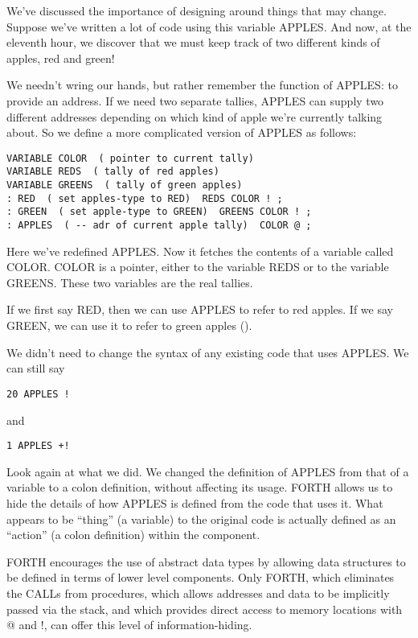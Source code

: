 We've discussed the importance of designing around things that may
change. Suppose we've written a lot of code using this variable APPLES.
And now, at the eleventh hour, we discover that we must keep track
of two different kinds of apples, red and green!

We needn't wring our hands, but rather remember the function of APPLES:
to provide an address. If we need two separate tallies, APPLES can
supply two different addresses depending on which kind of apple we're
currently talking about. So we define a more complicated version of
APPLES as follows:

\begin{verbatim}
VARIABLE COLOR  ( pointer to current tally)
VARIABLE REDS  ( tally of red apples)
VARIABLE GREENS  ( tally of green apples)
: RED  ( set apples-type to RED)  REDS COLOR ! ;
: GREEN  ( set apple-type to GREEN)  GREENS COLOR ! ;
: APPLES  ( -- adr of current apple tally)  COLOR @ ;
\end{verbatim}


Here we've redefined APPLES. Now it fetches the contents of a variable
called COLOR. COLOR is a pointer, either to the variable REDS or to
the variable GREENS. These two variables are the real tallies.

If we first say RED, then we can use APPLES to refer to red apples.
If we say GREEN, we can use it to refer to green apples ().

We didn't need to change the syntax of any existing code that uses
APPLES. We can still say

\begin{verbatim}
20 APPLES !
\end{verbatim}
and

\begin{verbatim}
1 APPLES +!
\end{verbatim}
Look again at what we did. We changed the definition of APPLES from
that of a variable to a colon definition, without affecting its usage.
FORTH allows us to hide the details of how APPLES is defined from
the code that uses it. What appears to be {}``thing'' (a variable)
to the original code is actually defined as an {}``action'' (a colon
definition) within the component.

FORTH encourages the use of abstract data types by allowing data structures
to be defined in terms of lower level components. Only FORTH, which
eliminates the CALLs from procedures, which allows addresses and data
to be implicitly passed via the stack, and which provides direct access
to memory locations with @ and !, can offer this level of information-hiding.

